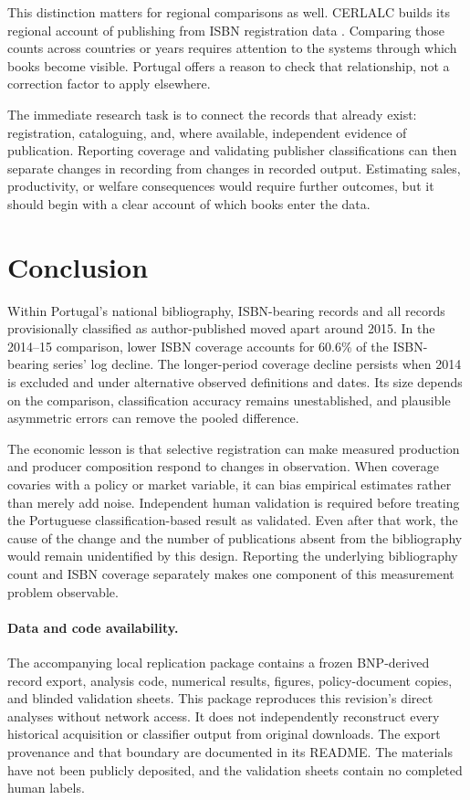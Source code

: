\documentclass[11pt]{article}
\begin{document}
This distinction matters for regional comparisons as well. CERLALC builds its regional account of publishing from ISBN registration data \citep{cerlalc2020}. Comparing those counts across countries or years requires attention to the systems through which books become visible. Portugal offers a reason to check that relationship, not a correction factor to apply elsewhere.

The immediate research task is to connect the records that already exist: registration, cataloguing, and, where available, independent evidence of publication. Reporting coverage and validating publisher classifications can then separate changes in recording from changes in recorded output. Estimating sales, productivity, or welfare consequences would require further outcomes, but it should begin with a clear account of which books enter the data.

\section{Conclusion}

Within Portugal's national bibliography, ISBN-bearing records and all records provisionally classified as author-published moved apart around 2015. In the 2014--15 comparison, lower ISBN coverage accounts for 60.6\% of the ISBN-bearing series' log decline. The longer-period coverage decline persists when 2014 is excluded and under alternative observed definitions and dates. Its size depends on the comparison, classification accuracy remains unestablished, and plausible asymmetric errors can remove the pooled difference.

The economic lesson is that selective registration can make measured production and producer composition respond to changes in observation. When coverage covaries with a policy or market variable, it can bias empirical estimates rather than merely add noise. Independent human validation is required before treating the Portuguese classification-based result as validated. Even after that work, the cause of the change and the number of publications absent from the bibliography would remain unidentified by this design. Reporting the underlying bibliography count and ISBN coverage separately makes one component of this measurement problem observable.

\paragraph{Data and code availability.}
The accompanying local replication package contains a frozen BNP-derived record export, analysis code, numerical results, figures, policy-document copies, and blinded validation sheets. This package reproduces this revision's direct analyses without network access. It does not independently reconstruct every historical acquisition or classifier output from original downloads. The export provenance and that boundary are documented in its README. The materials have not been publicly deposited, and the validation sheets contain no completed human labels.
\end{document}
